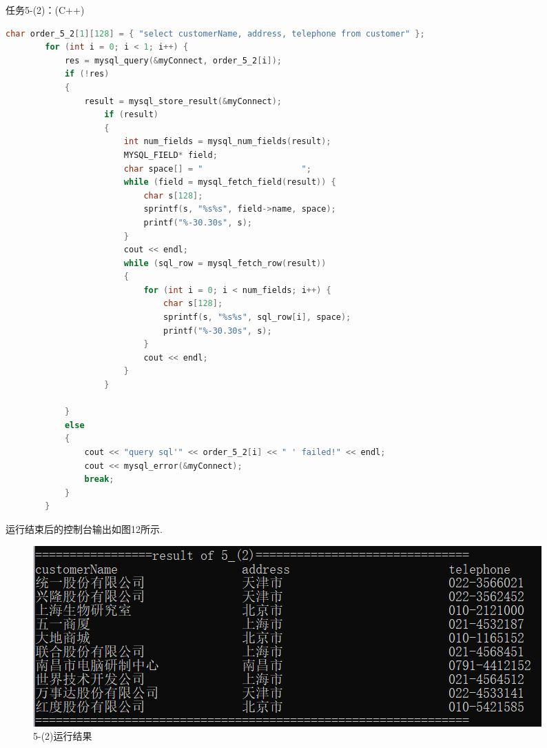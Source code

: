 \documentclass[a4paper,UTF8]{article}
\theoremstyle{definition}
\begin{document}
\begin{CJK}{UTF8}{gkai}
{\heiti \large 任务5-(2)：(C++)}
\begin{lstlisting}[language=C++]
char order_5_2[1][128] = { "select customerName, address, telephone from customer" };
        for (int i = 0; i < 1; i++) {
            res = mysql_query(&myConnect, order_5_2[i]);
            if (!res)
            {
                result = mysql_store_result(&myConnect);
                    if (result)
                    {
                        int num_fields = mysql_num_fields(result);
                        MYSQL_FIELD* field;
                        char space[] = "                    ";
                        while (field = mysql_fetch_field(result)) {
                            char s[128];
                            sprintf(s, "%s%s", field->name, space);
                            printf("%-30.30s", s);
                        }
                        cout << endl;
                        while (sql_row = mysql_fetch_row(result))
                        {
                            for (int i = 0; i < num_fields; i++) {
                                char s[128];
                                sprintf(s, "%s%s", sql_row[i], space);
                                printf("%-30.30s", s);
                            }
                            cout << endl;
                        }
                    }

            }
            else
            {
                cout << "query sql'" << order_5_2[i] << " ' failed!" << endl;
                cout << mysql_error(&myConnect);
                break;
            }
        }
\end{lstlisting}
\par 运行结束后的控制台输出如图12所示.
\begin{figure}[h]
\centering
\includegraphics[scale=0.7]{./img/5-2-1.png}
\caption{5-(2)运行结果}
\label{fig:label}
\end{figure}

\begin{flushleft}
\begin{CJK*}{UTF8}{heiti}

\end{CJK*}
\end{flushleft}
\end{CJK}
\end{document}
